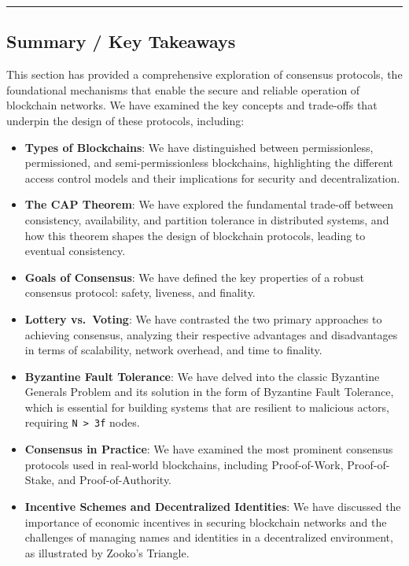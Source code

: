 \begin{center}\rule{0.5\linewidth}{0.5pt}\end{center}

\subsection{Summary / Key Takeaways}\label{summary-key-takeaways}

This section has provided a comprehensive exploration of consensus
protocols, the foundational mechanisms that enable the secure and
reliable operation of blockchain networks. We have examined the key
concepts and trade-offs that underpin the design of these protocols,
including:

\begin{itemize}
	\tightlist
	\item
	\textbf{Types of Blockchains}: We have distinguished between
	permissionless, permissioned, and semi-permissionless blockchains,
	highlighting the different access control models and their
	implications for security and decentralization.
	\item
	\textbf{The CAP Theorem}: We have explored the fundamental trade-off
	between consistency, availability, and partition tolerance in
	distributed systems, and how this theorem shapes the design of
	blockchain protocols, leading to eventual consistency.
	\item
	\textbf{Goals of Consensus}: We have defined the key properties of a
	robust consensus protocol: safety, liveness, and finality.
	\item
	\textbf{Lottery vs.~Voting}: We have contrasted the two primary
	approaches to achieving consensus, analyzing their respective
	advantages and disadvantages in terms of scalability, network
	overhead, and time to finality.
	\item
	\textbf{Byzantine Fault Tolerance}: We have delved into the classic
	Byzantine Generals Problem and its solution in the form of Byzantine
	Fault Tolerance, which is essential for building systems that are
	resilient to malicious actors, requiring
	\texttt{N\ \textgreater{}\ 3f} nodes.
	\item
	\textbf{Consensus in Practice}: We have examined the most prominent
	consensus protocols used in real-world blockchains, including
	Proof-of-Work, Proof-of-Stake, and Proof-of-Authority.
	\item
	\textbf{Incentive Schemes and Decentralized Identities}: We have
	discussed the importance of economic incentives in securing blockchain
	networks and the challenges of managing names and identities in a
	decentralized environment, as illustrated by Zooko's Triangle.
\end{itemize}

